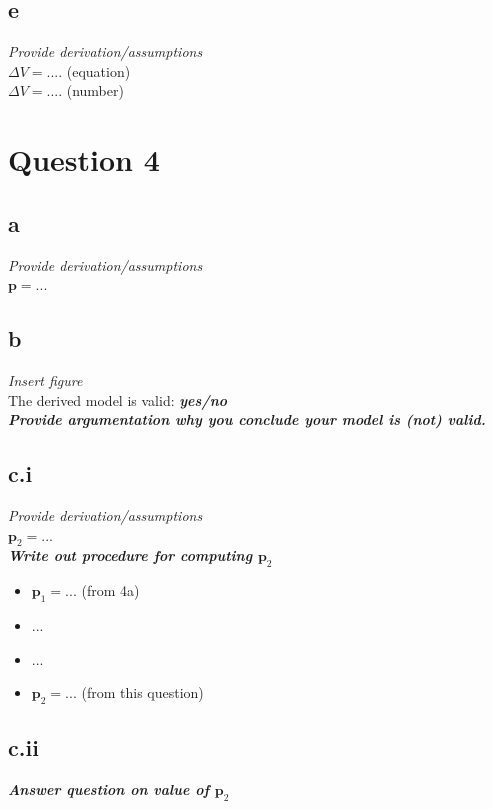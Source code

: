 \documentclass{report}
\begin{document}
\subsection*{e}
\textit{Provide derivation/assumptions}\\
$\Delta V=$.... (equation)\\
$\Delta V=$.... (number)

\clearpage

\section*{Question 4}

\subsection*{a}
\textit{Provide derivation/assumptions}\\
$\mathbf{p}=...$

\subsection*{b}
\textit{Insert figure}\\
The derived model is valid: \textbf{\textit{yes/no}}\\ 
\textbf{\textit{Provide argumentation why you conclude your model is (not) valid.}}

\subsection*{c.i}

\textit{Provide derivation/assumptions}\\
$\mathbf{p}_{2}=...$\\
\textbf{\textit{Write out procedure for computing $\mathbf{p}_{2}$}}\\
\begin{itemize}
    \item $\mathbf{p}_{1}=...$ (from 4a)
    \item ...
    \item ...
    \item $\mathbf{p}_{2}=...$ (from this question)
\end{itemize}

\subsection*{c.ii}

\textbf{\textit{Answer question on value of $\mathbf{p}_{2}$}}
\end{document}
